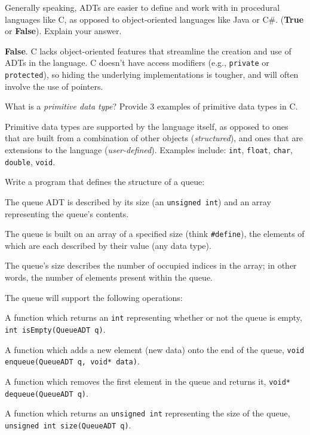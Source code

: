 
Generally speaking, ADTs are easier to define and work with in procedural languages like C, as opposed to object-oriented languages like Java or C\#. (\textbf{True} or \textbf{False}). Explain your answer.

\begin{answer} 
\textbf{False}. C lacks object-oriented features that streamline the creation and use of ADTs in the language. C doesn't have access modifiers (e.g., \texttt{private} or \texttt{protected}), so hiding the underlying implementations is tougher, and will often involve the use of pointers.
\end{answer}

\item What is a \emph{primitive data type}? Provide 3 examples of primitive data types in C.

\begin{answer}
Primitive data types are supported by the language itself, as opposed to ones that are built from a combination of other objects (\emph{structured}), and ones that are extensions to the language (\emph{user-defined}). Examples include: \texttt{int}, \texttt{float}, \texttt{char}, \texttt{double}, \texttt{void}.
\end{answer}

\newpage
\item Write a program that defines the structure of a queue:
\begin{itemize} {\small
	\item The queue ADT is described by its size (an \texttt{unsigned int}) and an array representing the queue's contents.
	\item The queue is built on an array of a specified size (think \texttt{\#define}), the elements of which are each described by their value (any data type).
	\item The queue's size describes the number of occupied indices in the array; in other words, the number of elements present within the queue.
	\item The queue will support the following operations:}
	\begin{itemize} {\scriptsize
		\item A function which returns an \texttt{int} representing whether or not the queue is empty, \texttt{int isEmpty(QueueADT q)}.
		\item A function which adds a new element (new data) onto the end of the queue, \texttt{void enqueue(QueueADT q, void* data)}.
		\item A function which removes the first element in the queue and returns it, \texttt{void* dequeue(QueueADT q)}.
		\item A function which returns an \texttt{unsigned int} representing the size of the queue, \texttt{unsigned int size(QueueADT q)}.}
	\end{itemize}
\end{itemize}

\begin{answer}
	
\end{answer}


